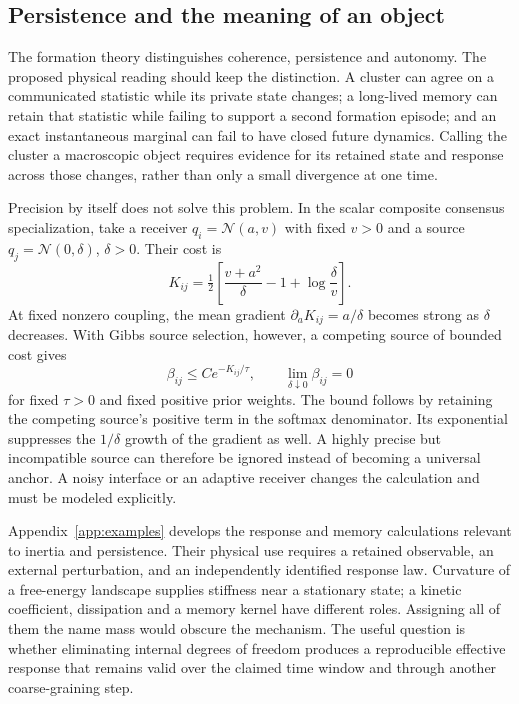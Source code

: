 \subsection{Persistence and the meaning of an object}

The formation theory distinguishes coherence, persistence and autonomy. The proposed physical reading should keep the distinction. A cluster can agree on a communicated statistic while its private state changes; a long-lived memory can retain that statistic while failing to support a second formation episode; and an exact instantaneous marginal can fail to have closed future dynamics. Calling the cluster a macroscopic object requires evidence for its retained state and response across those changes, rather than only a small divergence at one time.

Precision by itself does not solve this problem. In the scalar composite consensus specialization, take a receiver $q_i=\mathcal N(a,v)$ with fixed $v>0$ and a source $q_j=\mathcal N(0,\delta)$, $\delta>0$. Their cost is
\begin{equation}
K_{ij}=\tfrac12\left[\frac{v+a^2}{\delta}-1+\log\frac{\delta}{v}\right].
\label{eq:precision_source_cost}
\end{equation}
At fixed nonzero coupling, the mean gradient $\partial_aK_{ij}=a/\delta$ becomes strong as $\delta$ decreases. With Gibbs source selection, however, a competing source of bounded cost gives
\begin{equation}
\beta_{ij}\leq C e^{-K_{ij}/\tau},\qquad
\lim_{\delta\downarrow0}\beta_{ij}=0
\label{eq:precision_attention_rejection}
\end{equation}
for fixed $\tau>0$ and fixed positive prior weights. The bound follows by retaining the competing source's positive term in the softmax denominator. Its exponential suppresses the $1/\delta$ growth of the gradient as well. A highly precise but incompatible source can therefore be ignored instead of becoming a universal anchor. A noisy interface or an adaptive receiver changes the calculation and must be modeled explicitly.

Appendix~\ref{app:examples} develops the response and memory calculations relevant to inertia and persistence. Their physical use requires a retained observable, an external perturbation, and an independently identified response law. Curvature of a free-energy landscape supplies stiffness near a stationary state; a kinetic coefficient, dissipation and a memory kernel have different roles. Assigning all of them the name mass would obscure the mechanism. The useful question is whether eliminating internal degrees of freedom produces a reproducible effective response that remains valid over the claimed time window and through another coarse-graining step.

